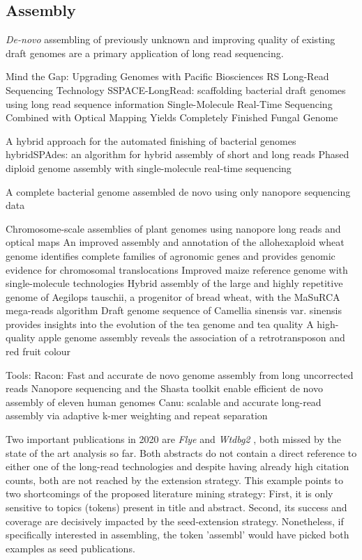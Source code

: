 \subsection{Assembly}
\label{subsec:state_of_art:assembly}

\textit{De-novo} assembling of previously unknown and improving quality of existing draft genomes are a primary application of long read sequencing.

Mind the Gap: Upgrading Genomes with Pacific Biosciences RS Long-Read Sequencing Technology \cite{English2012}
SSPACE-LongRead: scaffolding bacterial draft genomes using long read sequence information \cite{Boetzer2014}
Single-Molecule Real-Time Sequencing Combined with Optical Mapping Yields Completely Finished Fungal Genome \cite{Faino2015}

A hybrid approach for the automated finishing of bacterial genomes \cite{Bashir2012}
hybridSPAdes: an algorithm for hybrid assembly of short and long reads \cite{Antipov2016}
Phased diploid genome assembly with single-molecule real-time sequencing \cite{Chin2016}

A complete bacterial genome assembled de novo using only nanopore sequencing data \cite{Loman2015}

Chromosome-scale assemblies of plant genomes using nanopore long reads and optical maps \cite{Belser2018}
An improved assembly and annotation of the allohexaploid wheat genome identifies complete families of agronomic genes and provides genomic evidence for chromosomal translocations \cite{Clavijo2017}
Improved maize reference genome with single-molecule technologies \cite{Jiao2017}
Hybrid assembly of the large and highly repetitive genome of Aegilops tauschii, a progenitor of bread wheat, with the MaSuRCA mega-reads algorithm \cite{Zimin2017}
Draft genome sequence of Camellia sinensis var. sinensis provides insights into the evolution of the tea genome and tea quality \cite{Wei2018}
A high-quality apple genome assembly reveals the association of a retrotransposon and red fruit colour \cite{Zhang2019}


Tools:
Racon: Fast and accurate de novo genome assembly from long uncorrected reads \cite{Vaser2017}
Nanopore sequencing and the Shasta toolkit enable efficient de novo assembly of eleven human genomes \cite{Shafin2020}
Canu: scalable and accurate long-read assembly via adaptive k-mer weighting and repeat separation \cite{Koren2017}


Two important publications in 2020 are \textit{Flye} \cite{Kolmogorov2019} and \textit{Wtdbg2} \cite{Ruan2020}, both missed by the state of the art analysis so far.
Both abstracts do not contain a direct reference to either one of the long-read technologies and despite having already high citation counts, both are not reached by the extension strategy.
This example points to two shortcomings of the proposed literature mining strategy: First, it is only sensitive to topics (tokens) present in title and abstract.
Second, its success and coverage are decisively impacted by the seed-extension strategy.
Nonetheless, if specifically interested in assembling, the token 'assembl' would have picked both examples as seed publications.


